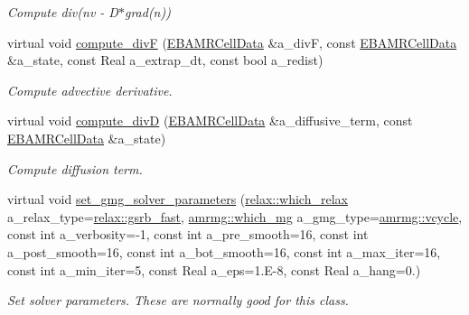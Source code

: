 \begin{DoxyCompactItemize}
\begin{DoxyCompactList}\small\item\em Compute div(nv -\/ D$\ast$grad(n)) \end{DoxyCompactList}\item 
virtual void \hyperlink{classcdr__tga_a8352b66535ad1664467abf170a496483}{compute\+\_\+divF} (\hyperlink{type__definitions_8H_a7e610f301989e5e07781c5e338bdb7c3}{E\+B\+A\+M\+R\+Cell\+Data} \&a\+\_\+divF, const \hyperlink{type__definitions_8H_a7e610f301989e5e07781c5e338bdb7c3}{E\+B\+A\+M\+R\+Cell\+Data} \&a\+\_\+state, const Real a\+\_\+extrap\+\_\+dt, const bool a\+\_\+redist)
\begin{DoxyCompactList}\small\item\em Compute advective derivative. \end{DoxyCompactList}\item 
virtual void \hyperlink{classcdr__tga_aa3064a033f73599b65ba44b17a3165df}{compute\+\_\+divD} (\hyperlink{type__definitions_8H_a7e610f301989e5e07781c5e338bdb7c3}{E\+B\+A\+M\+R\+Cell\+Data} \&a\+\_\+diffusive\+\_\+term, const \hyperlink{type__definitions_8H_a7e610f301989e5e07781c5e338bdb7c3}{E\+B\+A\+M\+R\+Cell\+Data} \&a\+\_\+state)
\begin{DoxyCompactList}\small\item\em Compute diffusion term. \end{DoxyCompactList}\item 
virtual void \hyperlink{classcdr__tga_a1adb96164393b57e127415b013fa0dbe}{set\+\_\+gmg\+\_\+solver\+\_\+parameters} (\hyperlink{namespacerelax_a1b017edf55c06d103aa5b61e015fe219}{relax\+::which\+\_\+relax} a\+\_\+relax\+\_\+type=\hyperlink{namespacerelax_a1b017edf55c06d103aa5b61e015fe219a9f7cf3af97cc2038d3aceba1dbd02c7b}{relax\+::gsrb\+\_\+fast}, \hyperlink{namespaceamrmg_aa3e75c1253c968e52106305f762a7952}{amrmg\+::which\+\_\+mg} a\+\_\+gmg\+\_\+type=\hyperlink{namespaceamrmg_aa3e75c1253c968e52106305f762a7952abcef3ebc4ac4f095d5cf0e2e2b35c23e}{amrmg\+::vcycle}, const int a\+\_\+verbosity=-\/1, const int a\+\_\+pre\+\_\+smooth=16, const int a\+\_\+post\+\_\+smooth=16, const int a\+\_\+bot\+\_\+smooth=16, const int a\+\_\+max\+\_\+iter=16, const int a\+\_\+min\+\_\+iter=5, const Real a\+\_\+eps=1.E-\/8, const Real a\+\_\+hang=0.)
\begin{DoxyCompactList}\small\item\em Set solver parameters. These are normally good for this class. \end{DoxyCompactList}\item 

\end{DoxyCompactItemize}
